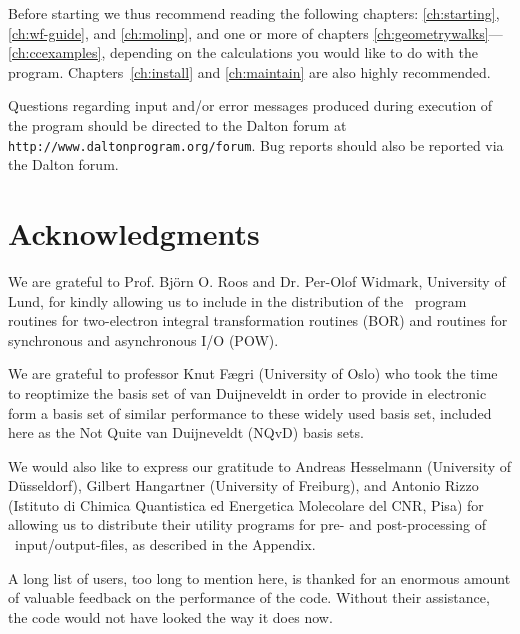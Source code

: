Before starting we thus recommend reading
the following chapters: \ref{ch:starting}, \ref{ch:wf-guide}, and
\ref{ch:molinp}, and one or more of chapters
\ref{ch:geometrywalks}---\ref{ch:ccexamples}, depending on the
calculations you would like to do with the
program. Chapters~\ref{ch:install} and \ref{ch:maintain} are also
highly recommended.

Questions regarding input and/or error messages produced during execution of the program
should be directed to the Dalton forum at
\verb|http://www.daltonprogram.org/forum|. Bug reports should also be reported via the Dalton forum.

\section{Acknowledgments}

We are grateful to Prof. Bj\"{o}rn O. Roos and Dr. Per-Olof
Widmark, University of Lund, for kindly allowing us to include in
the distribution of the \dalton\ program routines for
two-electron integral transformation routines
(BOR) and routines for synchronous and asynchronous I/O (POW).

We are grateful to professor Knut F\ae gri (University of Oslo) who
took the time to reoptimize the basis set of van Duijneveldt in order
to provide in electronic form a basis set of similar performance to
these widely used basis set, included here as the Not Quite van
Duijneveldt (NQvD) basis sets.

We would also like to express our gratitude to Andreas Hesselmann
(University of D\"{u}sseldorf), Gilbert Hangartner (University of
Freiburg), and Antonio
Rizzo (Istituto di Chimica Quantistica ed Energetica Molecolare del
CNR, Pisa) for allowing us to distribute their utility programs for
pre- and post-processing of \dalton\ input/output-files, as described
in the Appendix.

A long list of users, too long to mention here, is thanked for an
enormous amount of valuable feedback on the performance of the
code. Without their assistance, the code would not have looked the
way it does now.
